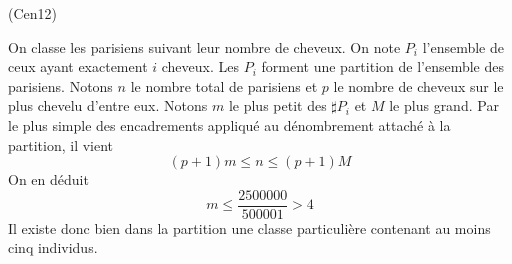 \begin{tiny}(Cen12)\end{tiny} On classe les parisiens suivant leur nombre de cheveux. On note $P_i$ l'ensemble de ceux ayant exactement $i$ cheveux. Les $P_i$ forment une partition de l'ensemble des parisiens.\newline
Notons $n$ le nombre total de parisiens et $p$ le nombre de cheveux sur le plus chevelu d'entre eux. Notons $m$ le plus petit des $\sharp P_i$ et $M$ le plus grand. Par le plus simple des encadrements appliqué au dénombrement attaché à la partition, il vient
\begin{displaymath}
 (p+1)m\leq n \leq (p+1)M
\end{displaymath}
On en déduit 
\begin{displaymath}
 m \leq \frac{2500000}{500001}>4
\end{displaymath}
Il existe donc bien dans la partition une classe particulière contenant au moins cinq individus.
